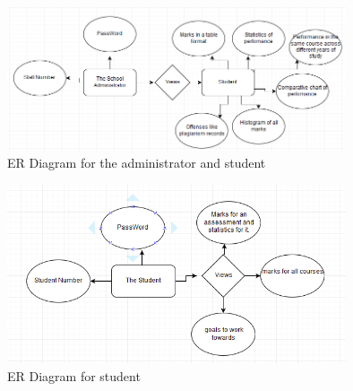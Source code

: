 \documentclass[10pt,onecolumn]{MainDocument}
\begin{document}
\begin{center}
\begin{figure}[h]
\centering
\includegraphics[width=10cm]{ER2}
\caption{ER Diagram for the administrator and student}
\end{figure}
\end{center}

\newpage

\begin{center}
\begin{figure}[h]
\centering
\includegraphics[width=10cm]{ER3}
\caption{ER Diagram for student}
\end{figure}
\end{center}
\end{document}
